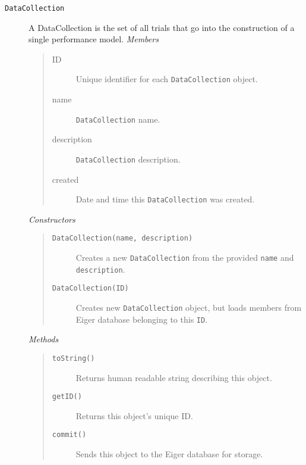 \begin{description}
\item[\texttt{DataCollection}] A DataCollection is the set of all trials that go into the construction of a single performance model.
  {\em Members}
	\begin{quote}
	\begin{description}
    \item[ID] Unique identifier for each \texttt{DataCollection} object.
    \item[name] \texttt{DataCollection} name.
    \item[description] \texttt{DataCollection} description. 
    \item[created] Date and time this \texttt{DataCollection} was created.
	\end{description}
	\end{quote}
  {\em Constructors}
	\begin{quote}
	\begin{description}
    \item[\texttt{DataCollection(name, description)}] Creates a new \texttt{DataCollection} from the provided \texttt{name} and \texttt{description}.
    \item[\texttt{DataCollection(ID)}] Creates new \texttt{DataCollection} object, but loads members from Eiger database belonging to this \texttt{ID}.
	\end{description}
	\end{quote}
	{\em Methods}
	\begin{quote}
	\begin{description}
		\item[\texttt{toString()}] Returns human readable string describing this object.
		\item[\texttt{getID()}] Returns this object's unique ID.
	\item[\texttt{commit()}] Sends this object to the Eiger database for storage.
	\end{description}
	\end{quote}
    
\end{description}
